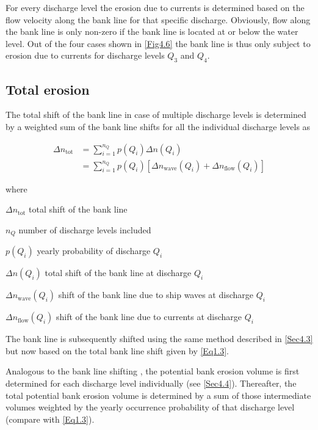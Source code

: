 For every discharge level the erosion due to currents is determined based on the flow velocity along the bank line for that specific discharge.
Obviously, flow along the bank line is only non-zero if the bank line is located at or below the water level.
Out of the four cases shown in \autoref{Fig4.6} the bank line is thus only subject to erosion due to currents for discharge levels $Q_3$ and $Q_4$.

\subsection{Total erosion}

The total shift of the bank line in case of multiple discharge levels is determined by a weighted sum of the bank line shifts for all the individual discharge levels as

\begin{align}
\Delta n_\text{tot} &= \sum_{i=1}^{n_Q} p(Q_i) \Delta n(Q_i) \\
                    &= \sum_{i=1}^{n_Q} p(Q_i) \left [ \Delta n_\text{wave}(Q_i) + \Delta n_\text{flow}(Q_i) \right ]
\label{Eq1.3}
\end{align}

where

\begin{symbollist}
\item[$\Delta n_\text{tot}$]  total shift of the bank line 
\item[$n_Q$] number of discharge levels included \unitbrackets{-}
\item[$p(Q_i)$] yearly probability of discharge $Q_i$ \unitbrackets{-}
\item[$\Delta n(Q_i)$] total shift of the bank line at discharge $Q_i$ 
\item[$\Delta n_\text{wave}(Q_i)$] shift of the bank line due to ship waves at discharge $Q_i$ 
\item[$\Delta n_\text{flow}(Q_i)$] shift of the bank line due to currents at discharge $Q_i$ 
\end{symbollist}

The bank line is subsequently shifted using the same method described in \autoref{Sec4.3} but now based on the total bank line shift given by \autoref{Eq1.3}.

Analogous to the bank line shifting , the potential bank erosion volume is first determined for each discharge level individually (see \autoref{Sec4.4}).
Thereafter, the total potential bank erosion volume is determined by a sum of those intermediate volumes weighted by the yearly occurrence probability of that discharge level (compare with \autoref{Eq1.3}).

